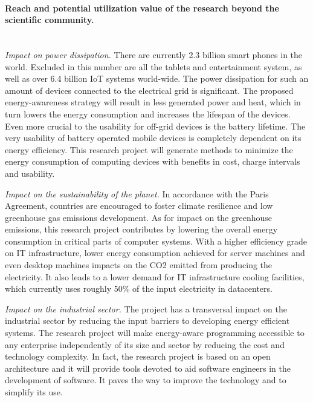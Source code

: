 \documentclass{article}
\begin{document}
\paragraph{Reach and potential utilization value of the research beyond the scientific community.}
\textit{\\Impact on power dissipation. }
There are currently 2.3 billion smart phones in the world.
Excluded in this number are all the tablets and entertainment system, as well as over 6.4 billion IoT systems world-wide.
The power dissipation for such an amount of devices connected to the electrical grid is significant. 
The proposed energy-awareness strategy will result in less generated power and heat, which in turn lowers the energy consumption and increases the lifespan of the devices. 
Even more crucial to the usability for off-grid devices is the battery lifetime. 
The very usability of battery operated mobile devices is completely dependent on its energy efficiency. 
This research project will generate methods to minimize the energy consumption of computing devices with benefits in cost, charge intervals and usability.\smallskip

\textit{Impact on the sustainability of the planet. }
In accordance with the Paris Agreement, countries are encouraged to foster climate resilience and low greenhouse gas emissions development. 
As for impact on the greenhouse emissions, this research project contributes by lowering the overall energy consumption in critical parts of computer systems. 
With a higher efficiency grade on IT infrastructure, lower energy consumption achieved for server machines and even desktop machines impacts on the CO2 emitted from producing the electricity. 
It also leads to a lower demand for IT infrastructure cooling facilities, which currently uses roughly 50\% of the input electricity in datacenters. \smallskip

\textit{Impact on the industrial sector.}
The project has a transversal impact on the industrial sector by reducing the input barriers to developing energy efficient systems. 
The research project will make energy-aware programming accessible to any enterprise independently of its size and sector by reducing the cost and technology complexity. 
In fact, the research project is based on an open architecture and it will provide tools devoted to aid software engineers in the development of software. 
It paves the way to improve the technology and to simplify its use. \smallskip
\end{document}

